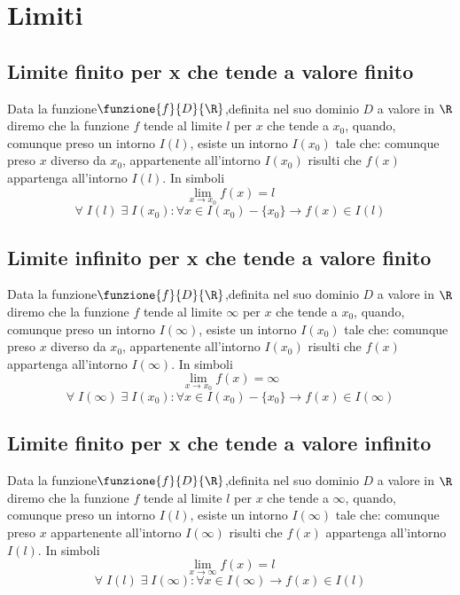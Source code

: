 \chapter{Limiti}
\section{Limite finito per x che tende a valore finito}
Data la funzione$\funzione{f}{D}{\R}$,definita nel suo dominio $D$ a valore in $\R$  diremo che la funzione $f$ tende al limite $l$ per $x$ che tende a $x_0$, quando, comunque preso un intorno $I(l)$, esiste un intorno $I(x_0)$ tale che: comunque preso $x$ diverso da $x_0$, appartenente  all'intorno $I(x_0)$ risulti che $f(x)$ appartenga all'intorno $I(l)$. In simboli
\begin{equation}
\lim_{x\to x_0}f(x)=l
\end{equation}
\begin{equation}
\forall\; I(l)\; \exists\; I(x_0) : \forall x\in I(x_0)-\lbrace x_0\rbrace \longrightarrow f(x)\in I(l)
\end{equation}
\section{Limite infinito per x che tende a valore finito}
Data la funzione$\funzione{f}{D}{\R}$,definita nel suo dominio $D$ a valore in $\R$  diremo che la funzione $f$ tende al limite $\infty$ per $x$ che tende a $x_0$, quando, comunque preso un intorno $I(\infty)$, esiste un intorno $I(x_0)$ tale che: comunque preso $x$ diverso da $x_0$, appartenente  all'intorno $I(x_0)$ risulti che $f(x)$ appartenga all'intorno $I(\infty)$. In simboli
\begin{equation}
\lim_{x\to x_0}f(x)=\infty
\end{equation}
\begin{equation}
\forall\; I(\infty)\; \exists\; I(x_0) : \forall x\in I(x_0)-\lbrace x_0\rbrace \longrightarrow f(x)\in I(\infty)
\end{equation}
\section{Limite finito per x che tende a valore infinito}
Data la funzione$\funzione{f}{D}{\R}$,definita nel suo dominio $D$ a valore in $\R$  diremo che la funzione $f$ tende al limite $l$ per $x$ che tende a $\infty$, quando, comunque preso un intorno $I(l)$, esiste un intorno $I(\infty)$ tale che: comunque preso $x$ appartenente  all'intorno $I(\infty)$ risulti che $f(x)$ appartenga all'intorno $I(l)$. In simboli
\begin{equation}
\lim_{x\to \infty}f(x)=l
\end{equation}
\begin{equation}
\forall\; I(l)\; \exists\; I(\infty) : \forall x\in I(\infty) \longrightarrow f(x)\in I(l)
\end{equation}
